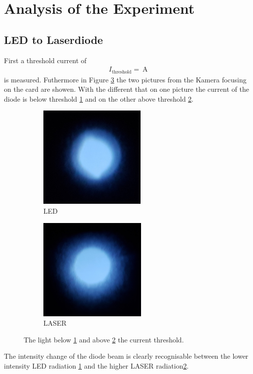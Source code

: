 \section{Analysis of the Experiment}
\label{sec:Auswertung}



\subsection{LED to Laserdiode}
\label{sec:LED_Laser}
First a threshold current of
\begin{align}
I_{\mathrm{threshold}} = \SI{}{\ampere}
\end{align}
is measured.
Futhermore in Figure \ref{fig:threshold} the two
pictures from the Kamera focusing on the card are showen.
With the different that on one picture the current of the diode is below threshold \ref{fig:LED} and
on the other above threshold \ref{fig:LASER}.
\begin{figure}
  \centering
  \begin{subfigure}{0.45\textwidth}
    \centering
    \includegraphics[height = 5cm]{figures/bevore_threshole.jpg}
    \caption{LED}
    \label{fig:LED}
  \end{subfigure}
  \begin{subfigure}{0.45\textwidth}
    \centering
    \includegraphics[height = 5cm]{figures/after_threshole.jpg}
    \caption{LASER}
    \label{fig:LASER}
  \end{subfigure}
\caption{The light below \ref{fig:LED} and above \ref{fig:LASER} the current threshold.}
\label{fig:threshold}
\end{figure}
The intensity change of the diode beam is clearly recognisable
between the lower intensity LED radiation \ref{fig:LED}
and the higher LASER radiation\ref{fig:LASER}.

